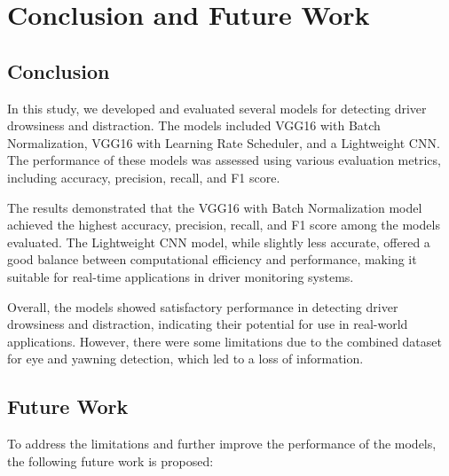 \chapter{Conclusion and Future Work}

\section{Conclusion}

In this study, we developed and evaluated several models for detecting driver drowsiness and distraction. The models included VGG16 with Batch Normalization, VGG16 with Learning Rate Scheduler, and a Lightweight CNN. The performance of these models was assessed using various evaluation metrics, including accuracy, precision, recall, and F1 score.

The results demonstrated that the VGG16 with Batch Normalization model achieved the highest accuracy, precision, recall, and F1 score among the models evaluated. The Lightweight CNN model, while slightly less accurate, offered a good balance between computational efficiency and performance, making it suitable for real-time applications in driver monitoring systems.

Overall, the models showed satisfactory performance in detecting driver drowsiness and distraction, indicating their potential for use in real-world applications. However, there were some limitations due to the combined dataset for eye and yawning detection, which led to a loss of information.

\section{Future Work}

To address the limitations and further improve the performance of the models, the following future work is proposed:


